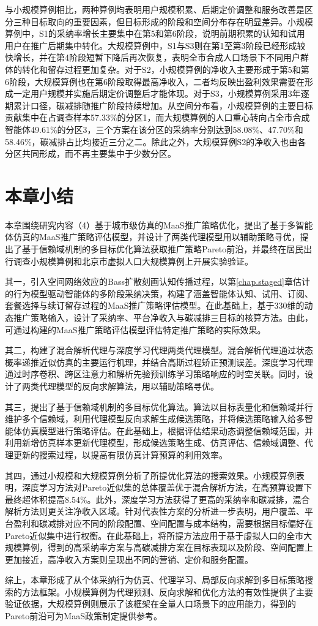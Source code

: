 与小规模算例相比，两种算例均表明用户规模积累、后期定价调整和服务改善是区分三种目标取向的重要因素，但目标形成的阶段和空间分布存在明显差异。小规模算例中，S1的采纳率增长主要集中在第5和第6阶段，说明前期积累的认知和试用用户在推广后期集中转化。大规模算例中，S1与S3则在第1至第3阶段已经形成较快增长，并在第4阶段短暂下降后再次恢复，表明全市合成人口场景下不同用户群体的转化和留存过程更加复杂。对于S2，小规模算例的净收入主要形成于第5和第6阶段，大规模算例也在第6阶段取得最高净收入，二者均反映出盈利效果需要在形成一定用户规模并实施后期定价调整后才能体现。对于S3，小规模算例采用3年逐期累计口径，碳减排随推广阶段持续增加。从空间分布看，小规模算例的主要目标贡献集中在占调查样本57.33\%的分区1，而大规模算例的人口重心转向占全市合成智能体49.61\%的分区3，三个方案在该分区的采纳率分别达到58.08\%、47.70\%和58.46\%，碳减排占比均接近三分之二。除此之外，大规模算例S2的净收入也由各分区共同形成，而不再主要集中于少数分区。

\section{本章小结}\label{sec.opt.summary}

本章围绕研究内容（4）基于城市级仿真的MaaS推广策略优化，提出了基于多智能体仿真的MaaS推广策略评估模型，并设计了两类代理模型用以辅助策略寻优，提出了基于信赖域机制的多目标优化算法获取推广策略Pareto前沿，并最终在居民出行调查小规模算例和北京市虚拟人口大规模算例上开展实验验证。

其一，引入空间网络效应的Bass扩散刻画认知传播过程，以第\ref{chap.staged}章估计的行为模型驱动智能体的多阶段采纳决策，构建了涵盖智能体认知、试用、订阅、套餐选择与续订留存过程的MaaS推广策略评估模型。在此基础上，基于330维的动态推广策略输入，设计了采纳率、平台净收入与碳减排三目标的核算方法。由此，可通过构建的MaaS推广策略评估模型评估特定推广策略的实际效果。

其二，构建了混合解析代理与深度学习代理两类代理模型。混合解析代理通过状态概率递推近似仿真的主要运行机理，并结合高斯过程矫正预测误差。深度学习代理通过时序卷积、跨区注意力和解析先验预训练学习策略响应的时空关联。同时，设计了两类代理模型的反向求解算法，用以辅助策略寻优。

其三，提出了基于信赖域机制的多目标优化算法。算法以目标表量化和信赖域并行维护多个信赖域，利用代理模型反向求解生成候选策略，并将候选策略输入给多智能体仿真模型进行策略评估。在此基础上，根据评估结果动态调整信赖域范围，并利用新增仿真样本更新代理模型，形成候选策略生成、仿真评估、信赖域调整、代理更新的搜索过程，以提高有限仿真计算预算的利用效率。

其四，通过小规模和大规模算例分析了所提优化算法的搜索效果。小规模算例表明，深度学习方法对Pareto近似集的总体覆盖优于混合解析方法，在高预算设置下最终超体积提高8.54\%。此外，深度学习方法获得了更高的采纳率和碳减排，混合解析方法则更关注净收入区域。针对代表性方案的分析进一步表明，用户覆盖、平台盈利和碳减排对应不同的阶段配置、空间配置与成本结构，需要根据目标偏好在Pareto近似集中进行权衡。在此基础上，将所提方法应用于基于虚拟人口的全市大规模算例，得到的高采纳率方案与高碳减排方案在目标表现以及阶段、空间配置上更加接近，高净收入方案则呈现出不同的营销、定价和服务配置。

综上，本章形成了从个体采纳行为仿真、代理学习、局部反向求解到多目标策略搜索的方法框架。小规模算例为代理预测、反向求解和优化方法的有效性提供了主要验证依据，大规模算例则展示了该框架在全量人口场景下的应用能力，得到的Pareto前沿可为MaaS政策制定提供参考。
